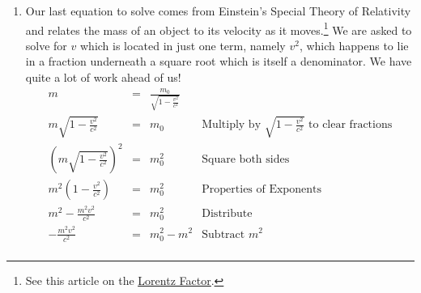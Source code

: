 \documentclass{ximera}
\begin{document}
\begin{example}
\begin{explanation}
\begin{enumerate}
\[\begin{array}{rclr}
 \frac{r_1}{r_2} & = &  \sqrt{\frac{M_2}{M_1}} & \\ 

\left(\frac{r_1}{r_2}\right)^2 & = & \left(\sqrt{\frac{M_2}{M_1}}\right)^2 & \text{Square both sides} \\ 

\frac{r_1^2}{r_2^2} & = & \frac{M_2}{M_1} & \\ 

r_1^2 M_1 & = & M_2r_2^2 & \text{Multiply by $r_2^2 M_1$ to clear fractions, assume $r_2$,  $M_1 \neq 0$ } \\ 


M_1 & = & \frac{M_2r_2^2}{r_1^2} & \text{Divide by $r_1^2$, assume $r_1 \neq 0$} \\
\end{array} \] As the reader may expect, checking the answer amounts to a good exercise in simplifying rational and radical expressions.  The fact that we are assuming all of the variables represent positive real numbers comes in to play, as well.

\item  Our last equation to solve comes from Einstein's Special Theory of Relativity and relates the mass of an object to its velocity as it moves.\footnote{See this article on the \href{http://en.wikipedia.org/wiki/Lorentz_factor}{\underline{Lorentz Factor}}.} We are asked to solve for $v$ which is located in just one term, namely $v^2$, which happens to lie in a fraction underneath a square root which is itself a denominator. We have quite a lot of work ahead of us!\[ \begin{array}{rclr}

 m &  = & \frac{m_0}{\sqrt{1 - \frac{v^2}{c^2}}} & \\

m \sqrt{1 - \frac{v^2}{c^2}} & = & m_0 & \text{Multiply by $\sqrt{1 - \frac{v^2}{c^2}}$ to clear fractions}\\  

\left(m \sqrt{1 - \frac{v^2}{c^2}}\right)^{2} & = & m_0^{2} & \text{Square both sides}\\  

m^2 \left(1 - \frac{v^2}{c^2}\right) & = &  m_0^{2} & \text{Properties of Exponents}\\ 

m^2 - \frac{m^2 v^2}{c^2} & = & m_0^{2} & \text{Distribute} \\ 

- \frac{m^2 v^2}{c^2} & = & m_0^{2} - m^2 & \text{Subtract $m^2$}  \\  


\end{array}\]
\end{enumerate}
\end{explanation}
\end{example}
\end{document}
